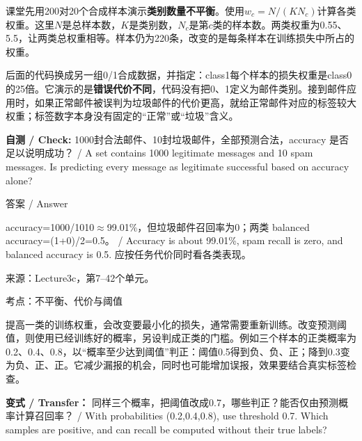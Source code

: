 课堂先用200对20个合成样本演示\textbf{类别数量不平衡}。使用\(w_c=N/(K N_c)\)计算各类权重。这里\(N\)是总样本数，\(K\)是类别数，\(N_c\)是第\(c\)类的样本数。两类权重为0.55、5.5，让两类总权重相等。样本仍为220条，改变的是每条样本在训练损失中所占的权重。


后面的代码换成另一组0/1合成数据，并指定：class1每个样本的损失权重是class0的25倍。它演示的是\textbf{错误代价不同}，代码没有把0、1定义为邮件类别。接到邮件应用时，如果正常邮件被误判为垃圾邮件的代价更高，就给正常邮件对应的标签较大权重；标签数字本身没有固定的“正常”或“垃圾”含义。


\textbf{自测 / Check:} 1000封合法邮件、10封垃圾邮件，全部预测合法，accuracy 是否足以说明成功？ / A set contains 1000 legitimate messages and 10 spam messages. Is predicting every message as legitimate successful based on accuracy alone?



\begin{StudySolution}{答案 / Answer}


accuracy=1000/1010\ensuremath{\approx}99.01\%，但垃圾邮件召回率为0；两类 balanced accuracy=(1+0)/2=0.5。 / Accuracy is about 99.01\%, spam recall is zero, and balanced accuracy is 0.5. 应按任务代价同时看各类表现。


\end{StudySolution}


来源：Lecture3c，第7–42个单元。








考点：不平衡、代价与阈值

提高一类的训练权重，会改变要最小化的损失，通常需要重新训练。改变预测阈值，则使用已经训练好的概率，另设判成正类的门槛。例如三个样本的正类概率为0.2、0.4、0.8，以“概率至少达到阈值”判正：阈值0.5得到负、负、正；降到0.3变为负、正、正。它减少漏报的机会，同时也可能增加误报，效果要结合真实标签检查。


\textbf{变式 / Transfer：} 同样三个概率，把阈值改成0.7，哪些判正？能否仅由预测概率计算召回率？ / With probabilities (0.2,0.4,0.8), use threshold 0.7. Which samples are positive, and can recall be computed without their true labels?


